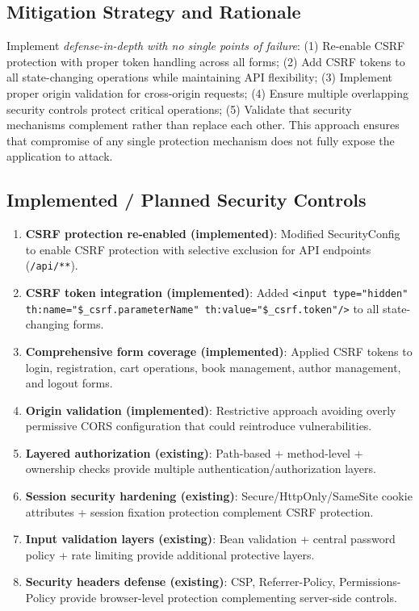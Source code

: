 \documentclass[]{UCD_CS_FYP_Report}
\begin{document}
\subsection*{Mitigation Strategy and Rationale}
Implement \textit{defense-in-depth with no single points of failure}: (1) Re-enable CSRF protection with proper token handling across all forms; (2) Add CSRF tokens to all state-changing operations while maintaining API flexibility; (3) Implement proper origin validation for cross-origin requests; (4) Ensure multiple overlapping security controls protect critical operations; (5) Validate that security mechanisms complement rather than replace each other. This approach ensures that compromise of any single protection mechanism does not fully expose the application to attack.

\subsection*{Implemented / Planned Security Controls}
\begin{enumerate}
	\item \textbf{CSRF protection re-enabled (implemented)}: Modified SecurityConfig to enable CSRF protection with selective exclusion for API endpoints (\texttt{/api/**}).
	\item \textbf{CSRF token integration (implemented)}: Added \texttt{<input type="hidden" th:name="\${\_csrf.parameterName}" th:value="\${\_csrf.token}"/>} to all state-changing forms.
	\item \textbf{Comprehensive form coverage (implemented)}: Applied CSRF tokens to login, registration, cart operations, book management, author management, and logout forms.
	\item \textbf{Origin validation (implemented)}: Restrictive approach avoiding overly permissive CORS configuration that could reintroduce vulnerabilities.
	\item \textbf{Layered authorization (existing)}: Path-based + method-level + ownership checks provide multiple authentication/authorization layers.
	\item \textbf{Session security hardening (existing)}: Secure/HttpOnly/SameSite cookie attributes + session fixation protection complement CSRF protection.
	\item \textbf{Input validation layers (existing)}: Bean validation + central password policy + rate limiting provide additional protective layers.
	\item \textbf{Security headers defense (existing)}: CSP, Referrer-Policy, Permissions-Policy provide browser-level protection complementing server-side controls.
\end{enumerate}
\end{document}
